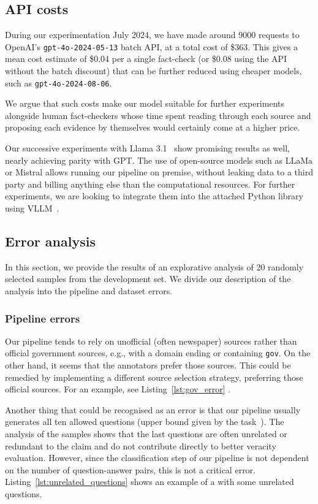 \subsection{API costs}
During our experimentation July 2024, we have made around 9000 requests to OpenAI's \texttt{gpt-4o-2024-05-13} batch API, at a total cost of \$363.
This gives a mean cost estimate of \$0.04 per a single fact-check (or \$0.08 using the API without the batch discount) that can be further reduced using cheaper models, such as \texttt{gpt-4o-2024-08-06}.

We argue that such costs make our model suitable for further experiments alongside human fact-checkers whose time spent reading through each source and proposing each evidence by themselves would certainly come at a higher price.

Our successive experiments with Llama 3.1~\cite{dubey2024llama3herdmodels} show promising results as well, nearly achieving parity with GPT.
The use of open-source models such as LLaMa or Mistral allows running our pipeline on premise, without leaking data to a third party and billing anything else than the computational resources.
For further experiments, we are looking to integrate them into the attached Python library using VLLM~\cite{vllm}.

\subsection{Error analysis}
In this section, we provide the results of an explorative analysis of 20 randomly selected samples from the development set. We divide our description of the analysis into the pipeline and dataset errors.


\subsubsection{Pipeline errors}
Our pipeline tends to rely on unofficial (often newspaper) sources rather than official government sources, e.g., with a domain ending or containing \texttt{gov}. On the other hand, it seems that the annotators prefer those sources. This could be remedied by implementing a different source selection strategy, preferring those official sources. For an example, see Listing~\ref{lst:gov_error} .

Another thing that could be recognised as an error is that our pipeline usually generates all ten allowed questions (upper bound given by the task~\cite{averitec2024}). The analysis of the samples shows that the last questions are often unrelated or redundant to the claim and do not contribute directly to better veracity evaluation. However, since the classification step of our pipeline is not dependent on the number of question-answer pairs, this is not a critical error.
Listing~\ref{lst:unrelated_questions}  shows an example of a  with some unrelated questions.

